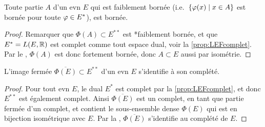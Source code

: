 \begin{corollary}
\label{corol:faibleFortBorne}
%
	Toute partie $A$ d'un evn $E$ qui est faiblement bornée (i.e.\ $\{\varphi(x) \mid x \in A\}$ est bornée pour toute $\varphi \in E^*$), est bornée.
\end{corollary}

\begin{proof}
	Remarquer que $\Phi(A) \subset E^{**}$ est *faiblement bornée, et que $E^* = L(E,\mathbb{R})$ est complet comme tout espace dual, voir la \cref{prop:LEFcomplet}.
	Par le , $\Phi(A)$ est donc fortement bornée, donc $A\subset E$ aussi par isométrie.
\end{proof}


\begin{corollary}
\label{corol:bidualComplete}
%
L'image fermée $\overline {\Phi(E)} \subset E^{**}$ d'un evn $E$ s'identifie à son complété. %
\end{corollary}

\begin{proof}
	Pour tout evn $E$, le dual $E^*$ est complet par la \cref{prop:LEFcomplet}, et donc $E^{**}$ est également complet. Ainsi $\overline {\Phi(E)}$ est un complet, en tant que partie fermée d'un complet, et contient le sous-ensemble dense $\Phi(E)$ qui est en bijection isométrique avec $E$. Par la , $\overline{\Phi(E)}$ s'identifie au complété de $E$.
\end{proof}



